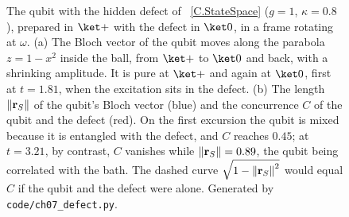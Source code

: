 \documentclass[handoutsbeamer.tex]{subfiles}
\begin{document}
\begin{frame}
{\begin{figure}[tbp]
\caption{The qubit with the hidden defect of \Chap~\ref{C.StateSpace} ($g=1$, $\kappa=0.8$), prepared in $\ket+$ with the defect in $\ket0$, in a frame rotating at $\omega$. (a) The Bloch vector of the qubit moves along the parabola $z=1-x^2$ inside the ball, from $\ket+$ to $\ket0$ and back, with a shrinking amplitude. It is pure at $\ket+$ and again at $\ket0$, first at $t=1.81$, when the excitation sits in the defect. (b) The length $\left\lVert \mathbf{r}_S \right\rVert$ of the qubit's Bloch vector (blue) and the concurrence $C$ of the qubit and the defect (red). On the first excursion the qubit is mixed because it is entangled with the defect, and $C$ reaches $0.45$; at $t=3.21$, by contrast, $C$ vanishes while $\left\lVert \mathbf{r}_S \right\rVert=0.89$, the qubit being correlated with the bath. The dashed curve $\sqrt{1-\left\lVert \mathbf{r}_S \right\rVert^2}$ would equal $C$ if the qubit and the defect were alone. Generated by \texttt{code/ch07\_defect.py}.}\label{fig:ch07:defect}
\end{figure}}
\end{frame}
\end{document}
